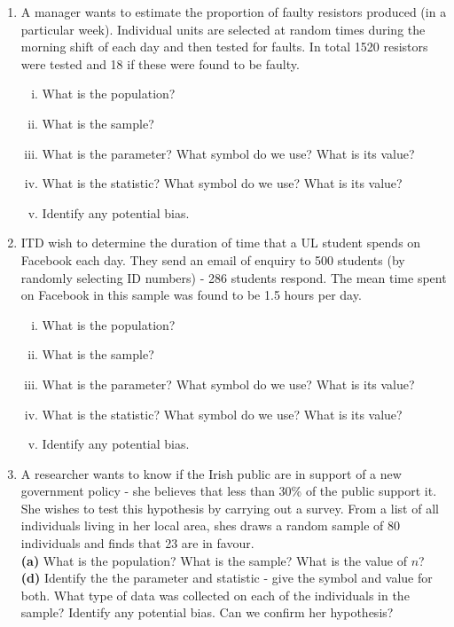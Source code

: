 \documentclass[]{report}
\begin{document}
\begin{enumerate}
\item 

A manager wants to estimate the proportion of faulty resistors produced (in a particular week). Individual units are selected at random times during the morning shift of each day and then tested for faults. In total 1520 resistors were tested and 18 if these were found to be faulty.
\begin{enumerate}[(i)]
\item What is the population?
\item What is the sample?
\item What is the parameter? What symbol do we use? What is its value?
\item What is the statistic? What symbol do we use? What is its value?
\item Identify any potential bias.
\end{enumerate}



\item
ITD wish to determine the duration of time that a UL student spends on Facebook each day. They send an email of enquiry to 500 students (by randomly selecting ID numbers) - 286 students respond. The mean time spent on Facebook in this sample was found to be 1.5 hours per day.
\begin{enumerate}[(i)]
\item What is the population?
\item What is the sample?
\item What is the parameter? What symbol do we use? What is its value?
\item What is the statistic? What symbol do we use? What is its value?
\item Identify any potential bias.
\end{enumerate}
\item A researcher wants to know if the Irish public are in support of a new government policy - she believes that less than 30\% of the public support it. She wishes to test this hypothesis by carrying out a survey. From a list of all individuals living in her local area, shes draws a random sample of 80 individuals and finds that 23 are in favour.\\[-0.2cm]

{\bf(a)} What is the population? What is the sample? What is the value of $n$?\quad \\{\bf(d)} Identify the the parameter and statistic - give the symbol and value for both. What type of data was collected on each of the individuals in the sample?   Identify any potential bias. Can we confirm her hypothesis?



\end{enumerate}
\end{document}
